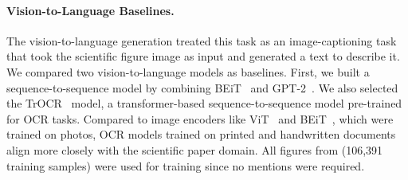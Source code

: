 \paragraph{Vision-to-Language Baselines.}
The vision-to-language generation treated this task as an image-captioning task 
that took the scientific figure image as input and generated a text to describe it.
We compared two vision-to-language models as baselines.
First, we built a sequence-to-sequence model by combining BEiT~\cite{bao2022beit} and GPT-2~\cite{radford2019language}.
We also selected the TrOCR~\cite{li2021trocr} model, a transformer-based sequence-to-sequence model pre-trained for OCR tasks.
Compared to image encoders like ViT~\cite{dosovitskiy2020vit} and BEiT~\cite{bao2022beit}, which were trained on photos, OCR models trained on printed and handwritten documents align more closely with the scientific paper domain.
All figures from \oldDataset (106,391 training samples) were used for training since no mentions were required.


